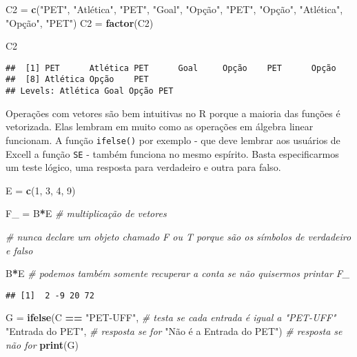 \documentclass[]{article}
\newenvironment{Shaded}{\begin{snugshade}}{\end{snugshade}}
\newcommand{\CommentTok}[1]{\textcolor[rgb]{0.56,0.35,0.01}{\textit{#1}}}
\newcommand{\DecValTok}[1]{\textcolor[rgb]{0.00,0.00,0.81}{#1}}
\newcommand{\KeywordTok}[1]{\textcolor[rgb]{0.13,0.29,0.53}{\textbf{#1}}}
\newcommand{\NormalTok}[1]{#1}
\newcommand{\OperatorTok}[1]{\textcolor[rgb]{0.81,0.36,0.00}{\textbf{#1}}}
\newcommand{\StringTok}[1]{\textcolor[rgb]{0.31,0.60,0.02}{#1}}
\begin{document}
\begin{Shaded}
\begin{Highlighting}[]
\NormalTok{C2 =}\StringTok{ }\KeywordTok{c}\NormalTok{(}\StringTok{"PET"}\NormalTok{, }\StringTok{"Atlética"}\NormalTok{, }\StringTok{"PET"}\NormalTok{, }\StringTok{"Goal"}\NormalTok{, }\StringTok{"Opção"}\NormalTok{, }\StringTok{"PET"}\NormalTok{, }\StringTok{"Opção"}\NormalTok{, }\StringTok{"Atlética"}\NormalTok{, }\StringTok{"Opção"}\NormalTok{, }\StringTok{"PET"}\NormalTok{)}
\NormalTok{C2 =}\StringTok{ }\KeywordTok{factor}\NormalTok{(C2)}

\NormalTok{C2}
\end{Highlighting}
\end{Shaded}

\begin{verbatim}
##  [1] PET      Atlética PET      Goal     Opção    PET      Opção   
##  [8] Atlética Opção    PET     
## Levels: Atlética Goal Opção PET
\end{verbatim}

Operações com vetores são bem intuitivas no R porque a maioria das
funções é vetorizada. Elas lembram em muito como as operações em álgebra
linear funcionam. A função \texttt{ifelse()} por exemplo - que deve
lembrar aos usuários de Excell a função \texttt{SE} - também funciona no
mesmo espírito. Basta especificarmos um teste lógico, uma resposta para
verdadeiro e outra para falso.

\begin{Shaded}
\begin{Highlighting}[]
\NormalTok{E =}\StringTok{ }\KeywordTok{c}\NormalTok{(}\DecValTok{1}\NormalTok{, }\DecValTok{3}\NormalTok{, }\DecValTok{4}\NormalTok{, }\DecValTok{9}\NormalTok{)}

\NormalTok{F_ =}\StringTok{ }\NormalTok{B}\OperatorTok{*}\NormalTok{E }\CommentTok{# multiplicação de vetores}

\CommentTok{# nunca declare um objeto chamado F ou T porque são os símbolos de verdadeiro e falso}

\NormalTok{B}\OperatorTok{*}\NormalTok{E }\CommentTok{# podemos também somente recuperar a conta se não quisermos printar F_}
\end{Highlighting}
\end{Shaded}

\begin{verbatim}
## [1]  2 -9 20 72
\end{verbatim}

\begin{Shaded}
\begin{Highlighting}[]
\NormalTok{G =}\StringTok{ }\KeywordTok{ifelse}\NormalTok{(C }\OperatorTok{==}\StringTok{ "PET-UFF"}\NormalTok{, }\CommentTok{# testa se cada entrada é igual a "PET-UFF"}
           \StringTok{"Entrada do PET"}\NormalTok{, }\CommentTok{# resposta se for}
           \StringTok{"Não é a Entrada do PET"}\NormalTok{) }\CommentTok{# resposta se não for}
\KeywordTok{print}\NormalTok{(G)}
\end{Highlighting}
\end{Shaded}
\end{document}
